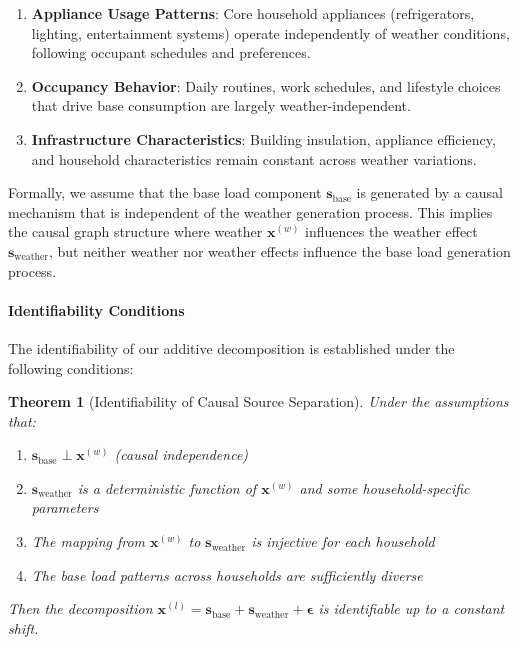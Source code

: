 \documentclass[journal]{IEEEtran}
\newtheorem{theorem}{Theorem}
\begin{document}
\begin{enumerate}
    \item \textbf{Appliance Usage Patterns}: Core household appliances (refrigerators, lighting, entertainment systems) operate independently of weather conditions, following occupant schedules and preferences.
    \item \textbf{Occupancy Behavior}: Daily routines, work schedules, and lifestyle choices that drive base consumption are largely weather-independent.
    \item \textbf{Infrastructure Characteristics}: Building insulation, appliance efficiency, and household characteristics remain constant across weather variations.
\end{enumerate}

Formally, we assume that the base load component $\mathbf{s}_{\text{base}}$ is generated by a causal mechanism that is independent of the weather generation process. This implies the causal graph structure where weather $\mathbf{x}^{(w)}$ influences the weather effect $\mathbf{s}_{\text{weather}}$, but neither weather nor weather effects influence the base load generation process.

\paragraph{Identifiability Conditions}
The identifiability of our additive decomposition is established under the following conditions:

\begin{theorem}[Identifiability of Causal Source Separation]
Under the assumptions that:
\begin{enumerate}
    \item $\mathbf{s}_{\text{base}} \perp \mathbf{x}^{(w)}$ (causal independence)
    \item $\mathbf{s}_{\text{weather}}$ is a deterministic function of $\mathbf{x}^{(w)}$ and some household-specific parameters
    \item The mapping from $\mathbf{x}^{(w)}$ to $\mathbf{s}_{\text{weather}}$ is injective for each household
    \item The base load patterns across households are sufficiently diverse
\end{enumerate}
Then the decomposition $\mathbf{x}^{(l)} = \mathbf{s}_{\text{base}} + \mathbf{s}_{\text{weather}} + \boldsymbol{\epsilon}$ is identifiable up to a constant shift.
\end{theorem}
\end{document}
